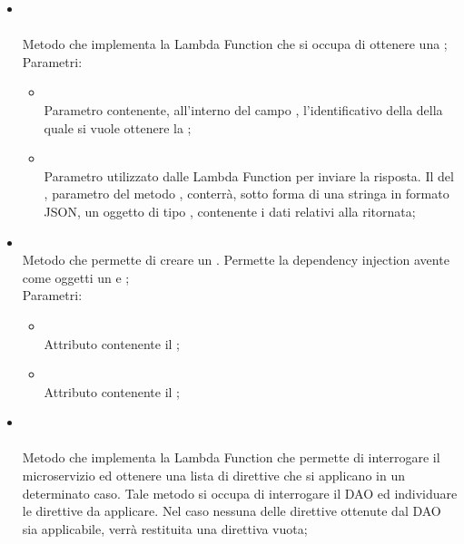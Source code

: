 \begin{itemize}
\begin{itemize}
\begin{itemize}
		\end{itemize}
		\item[]  \\\\		Metodo che implementa la Lambda Function che si occupa di ottenere una ;\\
		Parametri:
		\begin{itemize}
			\item {} \\
			Parametro contenente, all'interno del campo , l'identificativo della  della quale si vuole ottenere la ;
			\item {} \\
			Parametro utilizzato dalle Lambda Function per inviare la risposta. Il  del , parametro del metodo , conterrà, sotto forma di una stringa in formato JSON, un oggetto di tipo , contenente i dati relativi alla  ritornata;
		\end{itemize}
		\item[]  \\		Metodo che permette di creare un . Permette la dependency injection avente come oggetti un  e ;\\
		Parametri:
		\begin{itemize}
			\item {} \\
			Attributo contenente il ;
			\item {} \\
			Attributo contenente il ;
		\end{itemize}
		\item[]  \\\\		Metodo che implementa la Lambda Function che permette di interrogare il microservizio ed ottenere una lista di direttive che si applicano in un determinato caso.
		Tale metodo si occupa di interrogare il DAO ed individuare le direttive da applicare. Nel caso nessuna delle direttive ottenute dal DAO sia applicabile, verrà restituita una direttiva vuota;\\

\end{itemize}
\end{itemize}

